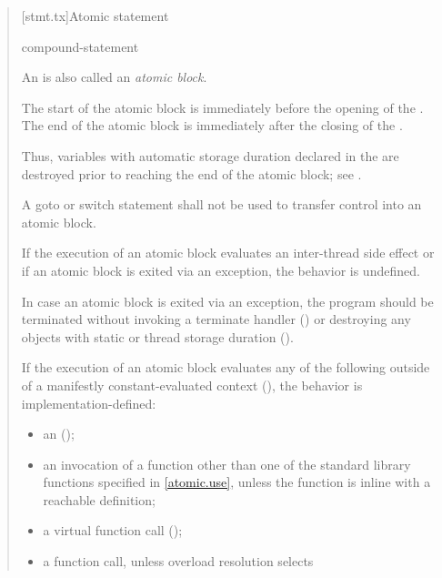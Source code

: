 \begin{quote}
[stmt.tx]{Atomic statement}  

\begin{bnf}
\br
      compound-statement
\end{bnf}

\pnum
An  is also called an \emph{atomic block}.

\pnum
The start of the atomic block is immediately before the opening
\tcode{\{} of the .
The end of the atomic block is immediately after
the closing \tcode{\}} of the .
\begin{note}
Thus, variables with automatic storage duration
declared in the 
are destroyed prior to reaching the end of the atomic block;
see .
\end{note}

\pnum
A goto or switch statement shall not be used to transfer control
into an atomic block.

\pnum
If the execution of an atomic block evaluates an inter-thread side
effect or if an atomic block is exited
via an exception, the behavior is undefined.

\pnum
\recommended
In case an atomic block is exited via an exception,
the program should be terminated
without invoking a terminate handler () or
destroying any objects
with static or thread storage duration ().

\pnum
If the execution of an atomic block evaluates any of the following
outside of a manifestly constant-evaluated context (),
the behavior is implementation-defined:

\begin{itemize}
\item
  an  ();
\item
  an invocation of a function other than one of the standard
  library functions specified in \ref{atomic.use}, unless
  the function is inline with a reachable definition;
\item
  a virtual function call ();
\item
  a function call, unless overload resolution selects


\end{itemize}
\end{quote}
